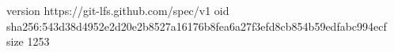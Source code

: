 version https://git-lfs.github.com/spec/v1
oid sha256:543d38d4952e2d20e2b8527a16176b8fea6a27f3efd8cb854b59edfabc994ecf
size 1253
